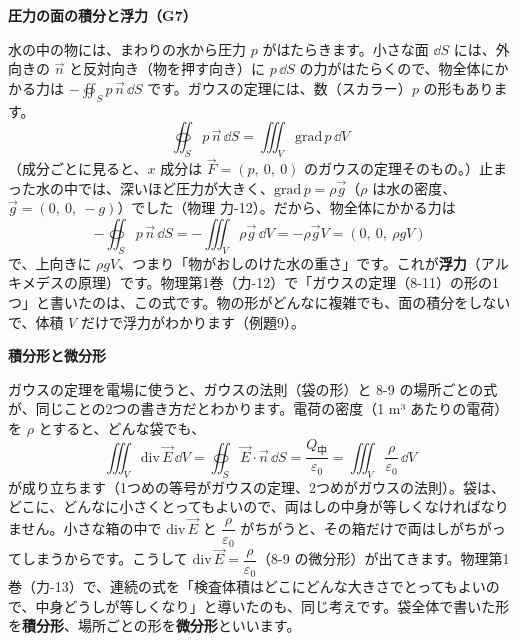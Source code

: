 \begin{motto}[5]
\textbf{圧力の面の積分と浮力（G7）}\par
水の中の物には、まわりの水から圧力 $p$ がはたらきます。小さな面 $\dd S$ には、外向きの $\vec n$ と反対向き（物を押す向き）に $p\,\dd S$ の力がはたらくので、物全体にかかる力は $-\displaystyle\oiint_S p\,\vec n\,\dd S$ です。ガウスの定理には、数（スカラー）$p$ の形もあります。
\[ \oiint_S p\,\vec n\,\dd S=\iiint_V\mathrm{grad}\,p\,\dd V \]
（成分ごとに見ると、$x$ 成分は $\vec F=(p,\ 0,\ 0)$ のガウスの定理そのもの。）止まった水の中では、深いほど圧力が大きく、$\mathrm{grad}\,p=\rho\vec g$（$\rho$ は水の密度、$\vec g=(0,\ 0,\ -g)$）でした（物理 力-12）。だから、物全体にかかる力は
\[ -\oiint_S p\,\vec n\,\dd S=-\iiint_V\rho\vec g\,\dd V=-\rho\vec gV=(0,\ 0,\ \rho gV) \]
で、上向きに $\rho gV$、つまり「物がおしのけた水の重さ」です。これが\textbf{浮力}（アルキメデスの原理）です。物理第1巻（力-12）で「ガウスの定理（8-11）の形の1つ」と書いたのは、この式です。物の形がどんなに複雑でも、面の積分をしないで、体積 $V$ だけで浮力がわかります（例題9）。
\end{motto}

\begin{seikaku}
\textbf{積分形と微分形}\par
ガウスの定理を電場に使うと、ガウスの法則（袋の形）と 8-9 の場所ごとの式が、同じことの2つの書き方だとわかります。電荷の密度（1 m³ あたりの電荷）を $\rho$ とすると、どんな袋でも、
\[ \iiint_V\mathrm{div}\,\vec E\,\dd V=\oiint_S\vec E\cdot\vec n\,\dd S=\frac{Q_{\text{中}}}{\varepsilon_0}=\iiint_V\frac{\rho}{\varepsilon_0}\,\dd V \]
が成り立ちます（1つめの等号がガウスの定理、2つめがガウスの法則）。袋は、どこに、どんなに小さくとってもよいので、両はしの中身が等しくなければなりません。小さな箱の中で $\mathrm{div}\,\vec E$ と $\dfrac{\rho}{\varepsilon_0}$ がちがうと、その箱だけで両はしがちがってしまうからです。こうして $\mathrm{div}\,\vec E=\dfrac{\rho}{\varepsilon_0}$（8-9 の微分形）が出てきます。物理第1巻（力-13）で、連続の式を「検査体積はどこにどんな大きさでとってもよいので、中身どうしが等しくなり」と導いたのも、同じ考えです。袋全体で書いた形を\textbf{積分形}、場所ごとの形を\textbf{微分形}といいます。
\end{seikaku}



